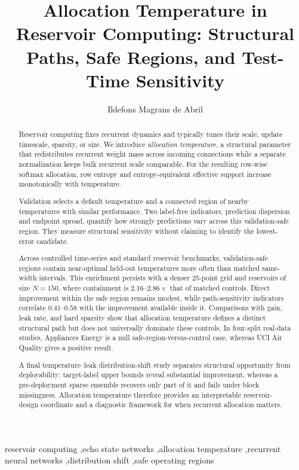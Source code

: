 \documentclass[preprint,12pt,authoryear]{elsarticle}
\begin{document}
\begin{frontmatter}

\title{Allocation Temperature in Reservoir Computing: Structural Paths, Safe Regions, and Test-Time Sensitivity}

\author[upc]{Ildefons Magrans de Abril}
\address[upc]{Universitat Polit\`ecnica de Catalunya - BarcelonaTech (UPC), Barcelona, Spain}

\begin{abstract}
Reservoir computing fixes recurrent dynamics and typically tunes their scale, update timescale, sparsity, or size. We introduce \emph{allocation temperature}, a structural parameter that redistributes recurrent weight mass across incoming connections while a separate normalization keeps bulk recurrent scale comparable. For the resulting row-wise softmax allocation, row entropy and entropy-equivalent effective support increase monotonically with temperature.

Validation selects a default temperature and a connected region of nearby temperatures with similar performance. Two label-free indicators, prediction dispersion and endpoint spread, quantify how strongly predictions vary across this validation-safe region. They measure structural sensitivity without claiming to identify the lowest-error candidate.

Across controlled time-series and standard reservoir benchmarks, validation-safe regions contain near-optimal held-out temperatures more often than matched same-width intervals. This enrichment persists with a denser 25-point grid and reservoirs of size $N=150$, where containment is $2.16$--$2.86\times$ that of matched controls. Direct improvement within the safe region remains modest, while path-sensitivity indicators correlate $0.41$--$0.58$ with the improvement available inside it. Comparisons with gain, leak rate, and hard sparsity show that allocation temperature defines a distinct structural path but does not universally dominate these controls. In four-split real-data studies, Appliances Energy is a null safe-region-versus-control case, whereas UCI Air Quality gives a positive result.

A final temperature--leak distribution-shift study separates structural opportunity from deployability: target-label upper bounds reveal substantial improvement, whereas a pre-deployment sparse ensemble recovers only part of it and fails under block missingness. Allocation temperature therefore provides an interpretable reservoir-design coordinate and a diagnostic framework for when recurrent allocation matters.
\end{abstract}

\begin{keyword}
reservoir computing \sep echo state networks \sep allocation temperature \sep recurrent neural networks \sep distribution shift \sep safe operating regions
\end{keyword}

\end{frontmatter}
\end{document}
